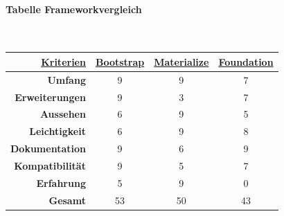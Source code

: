 	\paragraph{Tabelle Frameworkvergleich}~\\
	\begin{table}
		\begin{tabular}{rccc}
			\hline
			\multicolumn{1}{|r|}{{\underline{\textbf{Kriterien}}}} & \multicolumn{1}{c|}{{\underline{\textbf{Bootstrap}}}} & \multicolumn{1}{c|}{{ \underline{\textbf{Materialize}}}} & \multicolumn{1}{c|}{{\underline{\textbf{Foundation}}}} \\ \hline
			\multicolumn{1}{|r|}{\textbf{Umfang}}          & \multicolumn{1}{c|}{9}                        & \multicolumn{1}{c|}{9}                          & \multicolumn{1}{c|}{7}                         \\ \hline
			\multicolumn{1}{|r|}{\textbf{Erweiterungen}}   & \multicolumn{1}{c|}{9}                        & \multicolumn{1}{c|}{3}                          & \multicolumn{1}{c|}{7}                         \\ \hline
			\multicolumn{1}{|r|}{\textbf{Aussehen}}        & \multicolumn{1}{c|}{6}                        & \multicolumn{1}{c|}{9}                          & \multicolumn{1}{c|}{5}                         \\ \hline
			\multicolumn{1}{|r|}{\textbf{Leichtigkeit}}    & \multicolumn{1}{c|}{6}                        & \multicolumn{1}{c|}{9}                          & \multicolumn{1}{c|}{8}                         \\ \hline
			\multicolumn{1}{|r|}{\textbf{Dokumentation}}   & \multicolumn{1}{c|}{9}                        & \multicolumn{1}{c|}{6}                          & \multicolumn{1}{c|}{9}                         \\ \hline
			\multicolumn{1}{|r|}{\textbf{Kompatibilität}}  & \multicolumn{1}{c|}{9}                        & \multicolumn{1}{c|}{5}                          & \multicolumn{1}{c|}{7}                         \\ \hline
			\multicolumn{1}{|r|}{\textbf{Erfahrung}}       & \multicolumn{1}{c|}{5}                        & \multicolumn{1}{c|}{9}                          & \multicolumn{1}{c|}{0}                         \\ \hline
			\textbf{Gesamt}                                & 53                                            & 50                                              & 43                                            
		\end{tabular}
	\end{table}
